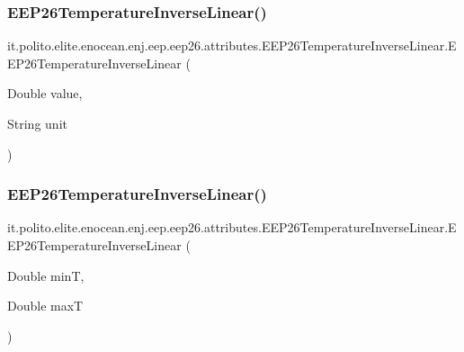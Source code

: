 \subsubsection{\texorpdfstring{E\+E\+P26\+Temperature\+Inverse\+Linear()}{EEP26TemperatureInverseLinear()}\hspace{0.1cm}{\footnotesize\ttfamily [2/3]}}
{\footnotesize\ttfamily it.\+polito.\+elite.\+enocean.\+enj.\+eep.\+eep26.\+attributes.\+E\+E\+P26\+Temperature\+Inverse\+Linear.\+E\+E\+P26\+Temperature\+Inverse\+Linear (\begin{DoxyParamCaption}\item[{Double}]{value,  }\item[{String}]{unit }\end{DoxyParamCaption})}

\hypertarget{classit_1_1polito_1_1elite_1_1enocean_1_1enj_1_1eep_1_1eep26_1_1attributes_1_1_e_e_p26_temperature_inverse_linear_af9de8d637f609f3aa633c463a8f6461f}{}\label{classit_1_1polito_1_1elite_1_1enocean_1_1enj_1_1eep_1_1eep26_1_1attributes_1_1_e_e_p26_temperature_inverse_linear_af9de8d637f609f3aa633c463a8f6461f} 
\subsubsection{\texorpdfstring{E\+E\+P26\+Temperature\+Inverse\+Linear()}{EEP26TemperatureInverseLinear()}\hspace{0.1cm}{\footnotesize\ttfamily [3/3]}}
{\footnotesize\ttfamily it.\+polito.\+elite.\+enocean.\+enj.\+eep.\+eep26.\+attributes.\+E\+E\+P26\+Temperature\+Inverse\+Linear.\+E\+E\+P26\+Temperature\+Inverse\+Linear (\begin{DoxyParamCaption}\item[{Double}]{minT,  }\item[{Double}]{maxT }\end{DoxyParamCaption})}



